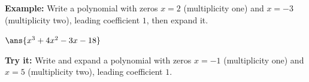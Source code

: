 \documentclass[12pt]{article}
\begin{document}
\begin{examplebox}
\textbf{Example:} \quad Write a polynomial with zeros $x = 2$ (multiplicity one)
and $x = -3$ (multiplicity two), leading coefficient $1$, then expand it.

$\ans{x^3 + 4x^2 - 3x - 18}$
\end{examplebox}

\begin{tryitbox}
\textbf{Try it:} \quad Write and expand a polynomial with zeros $x = -1$
(multiplicity one) and $x = 5$ (multiplicity two), leading coefficient $1$.\\[2pt]
\end{tryitbox}
\end{document}
